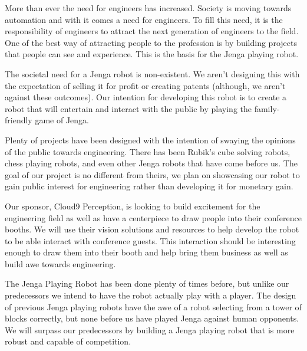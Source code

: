 More than ever the need for engineers has increased. Society is moving towards automation and with it comes a need for engineers. To fill this need, it is the responsibility of engineers to attract the next generation of engineers to the field. One of the best way of attracting people to the profession is by building projects that people can see and experience. This is the basis for the Jenga playing robot.

The societal need for a Jenga robot is non-existent. We aren't designing this with the expectation of selling it for profit or creating patents (although, we aren't against these outcomes). Our intention for developing this robot is to create a robot that will entertain and interact with the public by playing the family-friendly game of Jenga.

Plenty of projects have been designed with the intention of swaying the opinions of the public towards engineering. There has been Rubik's cube solving robots, chess playing robots, and even other Jenga robots that have come before us. The goal of our project is no different from theirs, we plan on showcasing our robot to gain public interest for engineering rather than developing it for monetary gain. 

Our sponsor, Cloud9 Perception, is looking to build excitement for the engineering field as well as have a centerpiece to draw people into their conference booths. We will use their vision solutions and resources to help develop the robot to be able interact with conference guests. This interaction should be interesting enough to draw them into their booth and help bring them business as well as build awe towards engineering.

The Jenga Playing Robot has been done plenty of times before, but unlike our predecessors we intend to have the robot actually play with a player. The design of previous Jenga playing robots have the awe of a robot selecting from a tower of blocks correctly, but none before us have played Jenga against human opponents. We will surpass our predecessors by building a Jenga playing robot that is more robust and capable of competition.
